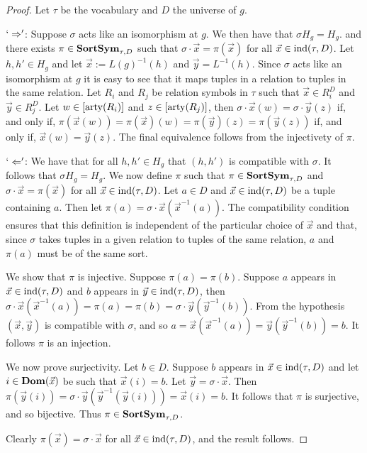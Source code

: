 \documentclass[../paper.tex]{subfiles}
\begin{document}
\begin{proof}
  Let $\tau$ be the vocabulary and $D$ the universe of $g$.
  
  $`\Rightarrow'$: Suppose $\sigma$ acts like an isomorphism at $g$. We then
  have that $\sigma H_g = H_g$. and there exists $\pi \in \text{\textbf{SortSym}}_{\tau,D}$ such that
  $\sigma \cdot \vec{x} = \pi (\vec{x})$ for all $\vec{x} \in \text{\upshape ind}(\tau, D)$.
  Let $h, h' \in H_g$ and let $\vec{x} := L(g)^{-1}(h)$ and $\vec{y} =
  L^{-1}(h)$. Since $\sigma$ acts like an isomorphism at $g$ it is easy to see
  that it maps tuples in a relation to tuples in the same relation. Let $R_i$
  and $R_j$ be relation symbols in $\tau$ such that $\vec{x} \in R^D_i$ and
  $\vec{y} \in R^D_j$. Let $w \in [\mathrm{arty} (R_i)]$ and $z \in [\mathrm{arty} (R_j)]$, then
  $\sigma \cdot \vec{x} (w) = \sigma \cdot \vec{y}(z)$ if, and only if,
  $\pi(\vec{x}(w)) = \pi (\vec{x})(w) = \pi (\vec{y})(z) = \pi(\vec{y}(z))$ if,
  and only if, $\vec{x}(w) = \vec{y}(z)$. The final equivalence follows from the
  injectivety of $\pi$.
  
  $`\Leftarrow'$: We have that for all $h, h' \in H_g$ that $(h, h')$ is
  compatible with $\sigma$. It follows that $\sigma H_g = H_g$. We now define
  $\pi$ such that $\pi \in \text{\textbf{SortSym}}_{\tau,D}$ and $\sigma \cdot \vec{x} = \pi
  (\vec{x})$ for all $\vec{x} \in \text{\upshape ind}(\tau, D)$. Let $a \in D$ and $\vec{x} \in
  \text{\upshape ind}(\tau, D)$ be a tuple containing $a$. Then let $\pi (a) = \sigma \cdot
  \vec{x} (\vec{x}^{-1}(a))$. The compatibility condition ensures that this
  definition is independent of the particular choice of $\vec{x}$ and that,
  since $\sigma$ takes tuples in a given relation to tuples of the same
  relation, $a$ and $\pi (a)$ must be of the same sort.
  
  We show that $\pi$ is injective. Suppose $\pi(a) = \pi(b)$. Suppose $a$
  appears in $\vec{x} \in \text{\upshape ind}(\tau, D)$ and $b$ appears in $\vec{y} \in
  \text{\upshape ind}(\tau, D)$, then $\sigma \cdot \vec{x} (\vec{x}^{-1}(a)) = \pi (a) =
  \pi(b) = \sigma \cdot \vec{y}(\vec{y}^{-1}(b))$. From the hypothesis
  $(\vec{x}, \vec{y})$ is compatible with $\sigma$, and so $a =
  \vec{x}(\vec{x}^{-1}(a)) = \vec{y}(\vec{y}^{-1}(b)) = b$. It follows $\pi$ is
  an injection.
  
  We now prove surjectivity. Let $b \in D$. Suppose $b$ appears in $\vec{x} \in
  \text{\upshape ind}(\tau, D)$ and let $i \in \text{\textbf{Dom}}(\vec{x})$ be such that $\vec{x}(i) = b$.
  Let $\vec{y} = \sigma \cdot \vec{x}$. Then $\pi (\vec{y}(i)) = \sigma \cdot
  \vec{y} (\vec{y}^{-1}(\vec{y}(i))) = \vec{x}(i) = b$. It follows that $\pi$ is
  surjective, and so bijective. Thus $\pi \in \text{\textbf{SortSym}}_{\tau,D}$.

  Clearly $\pi (\vec{x}) = \sigma \cdot \vec{x}$ for all $\vec{x} \in \text{\upshape ind}(\tau,
  D)$, and the result follows.
\end{proof}
\end{document}

